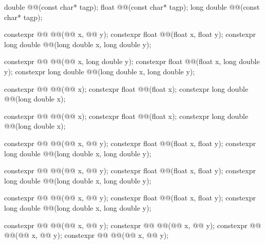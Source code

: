 \begin{codeblock}
{  double      @@(const char* tagp);
  float       @@(const char* tagp);
  long double @@(const char* tagp);

  constexpr @@ @@(@@ x, @@ y);
  constexpr float               @@(float x, float y);
  constexpr long double         @@(long double x, long double y);

  constexpr @@ @@(@@ x, long double y);
  constexpr float               @@(float x, long double y);
  constexpr long double         @@(long double x, long double y);

  constexpr @@ @@(@@ x);
  constexpr float               @@(float x);
  constexpr long double         @@(long double x);

  constexpr @@ @@(@@ x);
  constexpr float               @@(float x);
  constexpr long double         @@(long double x);

  constexpr @@ @@(@@ x, @@ y);
  constexpr float               @@(float x, float y);
  constexpr long double         @@(long double x, long double y);

  constexpr @@ @@(@@ x, @@ y);
  constexpr float               @@(float x, float y);
  constexpr long double         @@(long double x, long double y);

  constexpr @@ @@(@@ x, @@ y);
  constexpr float               @@(float x, float y);
  constexpr long double         @@(long double x, long double y);

  constexpr @@ @@(@@ x, @@ y);
  constexpr @@ @@(@@ x, @@ y);
  constexpr @@ @@(@@ x, @@ y);
  constexpr @@ @@(@@ x, @@ y);

}
\end{codeblock}
